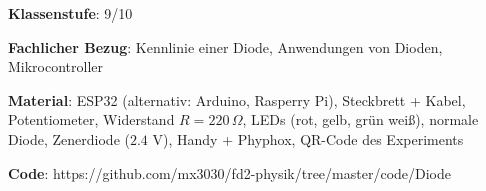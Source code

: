\documentclass[../main.tex]{subfiles}
\begin{document}
\begin{tcolorbox}[
    width=\textwidth,
    height=\textheight,
    title=Phyphox: Kennlinien von verschiedenen Dioden,
    fonttitle=\Large,
    before title=\vspace{0.2cm}, after title=\vspace{0.2cm},
    colback=white,
    title filled=true, 
    colbacktitle=myorange,
    colframe=black,
    coltitle=black,
    ]

    \vspace{0.2cm}

    \textbf{Klassenstufe}: 9/10

    \vspace{0.5cm}

    \textbf{Fachlicher Bezug}: Kennlinie einer Diode, Anwendungen von Dioden, Mikrocontroller 

    \vspace{0.5cm}
        \textbf{Material}: ESP32 (alternativ: Arduino, Rasperry Pi), Steckbrett + Kabel, Potentiometer, Widerstand $R=220\,\Omega$, LEDs (rot, gelb, grün weiß), normale Diode, Zenerdiode ($2.4$ V), Handy + Phyphox, QR-Code des Experiments

    \vspace{0.5cm}
    \textbf{Code}: https://github.com/mx3030/fd2-physik/tree/master/code/Diode
        

\end{tcolorbox}
\end{document}
